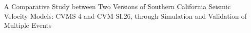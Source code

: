 % 
A Comparative Study between Two Versions of Southern California Seismic Velocity Models: CVMS-4 and CVM-SI.26, through Simulation and Validation of Multiple Events
% 

